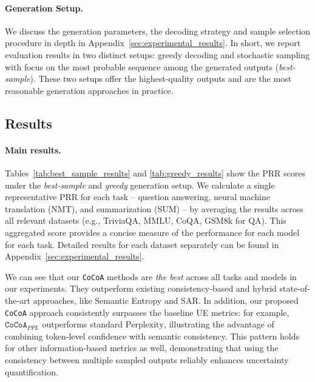\paragraph{Generation Setup.}
  We discuss the generation parameters, the decoding strategy and sample selection procedure in depth in Appendix~\ref{sec:experimental_results}. In short, we report evaluation results in two distinct setups: greedy decoding and stochastic sampling with focus on the most probable sequence among the generated outputs (\textit{best-sample}). These two setups offer the highest-quality outputs and are the most reasonable generation approaches in practice. 


\subsection{Results}
\paragraph{Main results.}
  Tables~\ref{tab:best_sample_results} and \ref{tab:greedy_results} show the PRR scores under the \textit{best‐sample} and  \textit{greedy} generation setup. We calculate a single representative PRR for each task -- question answering, neural machine translation (NMT), and summarization (SUM) -- by averaging the results across all relevant datasets (e.g., TriviaQA, MMLU, CoQA, GSM8k for QA). This aggregated score provides a concise measure of the performance for each model for each task. Detailed results for each dataset separately can be found in Appendix~\ref{sec:experimental_results}. 

  We can see that our \texttt{CoCoA} methods are \textit{the best} across all tasks and models in our experiments. They outperform existing consistency‐based and hybrid state‐of‐the‐art approaches, like Semantic Entropy and SAR. In addition, our proposed \texttt{CoCoA} approach consistently surpasses the baseline UE metrics: for example, $\texttt{CoCoA}_{PPL}$ outperforms standard $\text{Perplexity}$, illustrating the advantage of combining token‐level confidence with semantic consistency. This pattern holds for other information‐based metrics as well, demonstrating that using the consistency between multiple sampled outputs reliably enhances uncertainty quantification.

